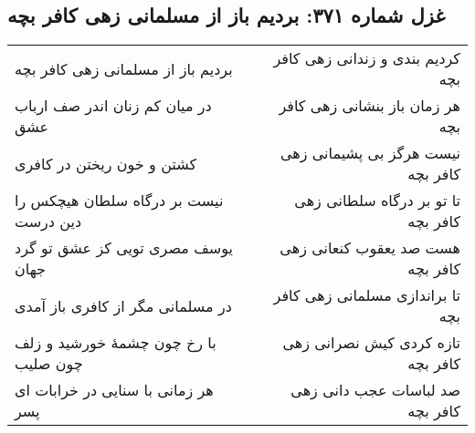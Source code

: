 \begin{center}
\section*{غزل شماره ۳۷۱: بردیم باز از مسلمانی زهی کافر بچه}
\label{sec:371}
\begin{longtable}{l p{0.5cm} r}
بردیم باز از مسلمانی زهی کافر بچه
&&
کردیم بندی و زندانی زهی کافر بچه
\\
در میان کم زنان اندر صف ارباب عشق
&&
هر زمان باز بنشانی زهی کافر بچه
\\
کشتن و خون ریختن در کافری
&&
نیست هرگز بی پشیمانی زهی کافر بچه
\\
نیست بر درگاه سلطان هیچکس را دین درست
&&
تا تو بر درگاه سلطانی زهی کافر بچه
\\
یوسف مصری تویی کز عشق تو گرد جهان
&&
هست صد یعقوب کنعانی زهی کافر بچه
\\
در مسلمانی مگر از کافری باز آمدی
&&
تا براندازی مسلمانی زهی کافر بچه
\\
با رخ چون چشمهٔ خورشید و زلف چون صلیب
&&
تازه کردی کیش نصرانی زهی کافر بچه
\\
هر زمانی با سنایی در خرابات ای پسر
&&
صد لباسات عجب دانی زهی کافر بچه
\\
\end{longtable}
\end{center}
